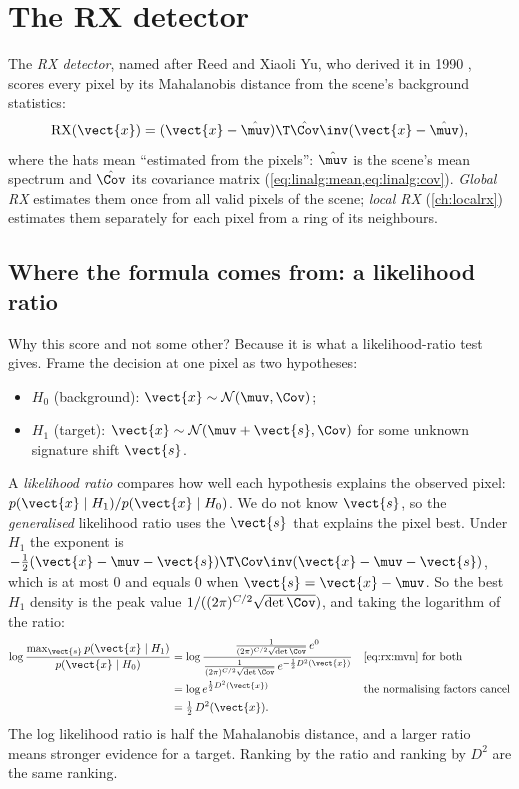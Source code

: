 \section{The RX detector}\label{sec:rx:rx}

The \emph{RX detector}, named after Reed and Xiaoli Yu, who derived it in 1990
\citep{reed1990adaptive}, scores every pixel by its Mahalanobis distance from the scene's background
statistics:
\begin{equation}\label{eq:rx:rx}
\text{RX}(\vect{x}) = (\vect{x} - \hat{\muv})\T\hat{\Cov}\inv(\vect{x} - \hat{\muv}),
\end{equation}
where the hats mean ``estimated from the pixels'': $\hat\muv$ is the scene's mean spectrum and
$\hat\Cov$ its covariance matrix (\cref{eq:linalg:mean,eq:linalg:cov}). \emph{Global RX} estimates
them once from all valid pixels of the scene; \emph{local RX} (\cref{ch:localrx}) estimates them
separately for each pixel from a ring of its neighbours.

\subsection{Where the formula comes from: a likelihood ratio}

Why this score and not some other? Because it is what a likelihood-ratio test gives. Frame the
decision at one pixel as two hypotheses:
\begin{itemize}
  \item $H_0$ (background): $\vect{x} \sim \mathcal{N}(\muv, \Cov)$;
  \item $H_1$ (target): $\vect{x} \sim \mathcal{N}(\muv + \vect{s}, \Cov)$ for some unknown signature
    shift $\vect{s}$.
\end{itemize}
A \emph{likelihood ratio} compares how well each hypothesis explains the
observed pixel: $p(\vect{x}\mid H_1)/p(\vect{x}\mid H_0)$. We do not know $\vect{s}$, so the
\emph{generalised} likelihood ratio uses the $\vect{s}$ that explains the pixel best. Under $H_1$
the exponent is $-\frac12(\vect{x} - \muv - \vect{s})\T\Cov\inv(\vect{x} - \muv - \vect{s})$, which is
at most 0 and equals 0 when $\vect{s} = \vect{x} - \muv$. So the best $H_1$ density is the peak
value $1/((2\pi)^{C/2}\sqrt{\det\Cov})$, and taking the logarithm of the ratio:
\begin{align*}
\log\frac{\max_{\vect{s}} p(\vect{x}\mid H_1)}{p(\vect{x}\mid H_0)}
&= \log\frac{\frac{1}{(2\pi)^{C/2}\sqrt{\det\Cov}}\,e^{0}}
  {\frac{1}{(2\pi)^{C/2}\sqrt{\det\Cov}}\,e^{-\frac12 D^2(\vect{x})}}
  && \text{\cref{eq:rx:mvn} for both}\\
&= \log e^{\frac12 D^2(\vect{x})}
  && \text{the normalising factors cancel}\\
&= \tfrac12\,D^2(\vect{x}) .
\end{align*}
The log likelihood ratio is half the Mahalanobis distance, and a larger ratio means stronger
evidence for a target. Ranking by the ratio and ranking by $D^2$ are the same ranking.

